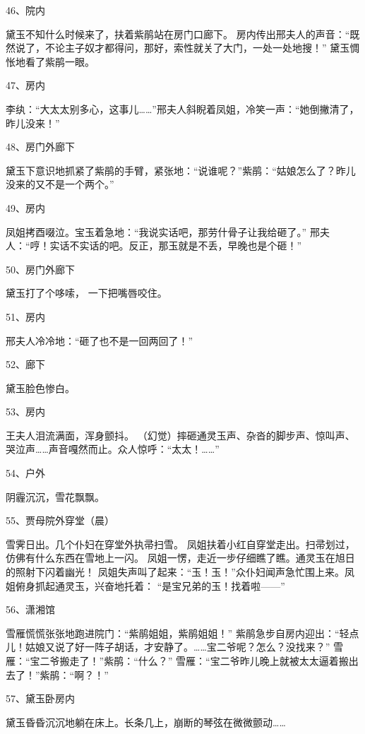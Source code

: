 46、院内\par
黛玉不知什么时候来了，扶着紫鹃站在房门口廊下。
房内传出邢夫人的声音：“既然说了，不论主子奴才都得问，那好，索性就关了大门，一处一处地搜！”
黛玉惆怅地看了紫鹃一眼。

47、房内\par
李纨：“大太太别多心，这事儿……”邢夫人斜睨着凤姐，冷笑一声：“她倒撇清了，昨儿没来！”

48、房门外廊下\par
黛玉下意识地抓紧了紫鹃的手臂，紧张地：“说谁呢？”紫鹃：“姑娘怎么了？昨儿没来的又不是一个两个。”

49、房内\par
凤姐拷酉啜泣。宝玉着急地：“我说实话吧，那劳什骨子让我给砸了。”
邢夫人：“哼！实话不实话的吧。反正，那玉就是不丢，早晚也是个砸！”

50、房门外廊下\par
黛玉打了个哆嗦， 一下把嘴唇咬住。

51、房内\par
邢夫人冷冷地：“砸了也不是一回两回了！”

52、廊下\par
黛玉脸色惨白。

53、房内\par
王夫人泪流满面，浑身颤抖。
（幻觉）摔砸通灵玉声、杂沓的脚步声、惊叫声、哭泣声……声音嘎然而止。众人惊呼：“太太！……” 

54、户外\par
阴霾沉沉，雪花飘飘。

55、贾母院外穿堂（晨）\par
雪霁日出。几个仆妇在穿堂外执帚扫雪。
凤姐扶着小红自穿堂走出。扫帚划过，仿佛有什么东西在雪地上一闪。
凤姐一愣，走近一步仔细瞧了瞧。通灵玉在旭日的照射下闪着幽光！
凤姐失声叫了起来：“玉！玉！”众仆妇闻声急忙围上来。凤姐俯身抓起通灵玉，兴奋地托着：
“是宝兄弟的玉！找着啦——”

56、潇湘馆\par
雪雁慌慌张张地跑进院门：“紫鹃姐姐，紫鹃姐姐！”
紫鹃急步自房内迎出：“轻点儿！姑娘又说了好一阵子胡话，才安静了。……宝二爷呢？怎么？没找来？”
雪雁：“宝二爷搬走了！”紫鹃：“什么？”
雪雁：“宝二爷昨儿晚上就被太太逼着搬出去了！”紫鹃：“啊？！”

57、黛玉卧房内\par
黛玉昏昏沉沉地躺在床上。长条几上，崩断的琴弦在微微颤动……